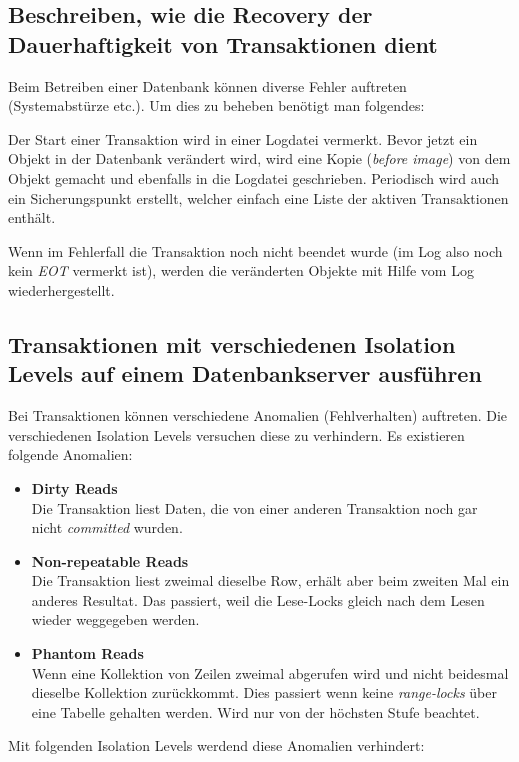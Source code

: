 \subsection{Beschreiben, wie die Recovery der Dauerhaftigkeit von Transaktionen dient}

Beim Betreiben einer Datenbank können diverse Fehler auftreten (Systemabstürze etc.). Um dies zu beheben benötigt man folgendes:

Der Start einer Transaktion wird in einer Logdatei vermerkt. Bevor jetzt ein Objekt in der Datenbank verändert wird, wird eine Kopie (\emph{before image}) von dem Objekt gemacht und ebenfalls in die Logdatei geschrieben. Periodisch wird auch ein Sicherungspunkt erstellt, welcher einfach eine Liste der aktiven Transaktionen enthält.

Wenn im Fehlerfall die Transaktion noch nicht beendet wurde (im Log also noch kein \emph{EOT} vermerkt ist), werden die veränderten Objekte mit Hilfe vom Log wiederhergestellt.

\subsection{Transaktionen mit verschiedenen Isolation Levels auf einem Datenbankserver ausführen}

Bei Transaktionen können verschiedene Anomalien (Fehlverhalten) auftreten. Die verschiedenen Isolation Levels versuchen diese zu verhindern. Es existieren folgende Anomalien:

\begin{itemize}
	\item \textbf{Dirty Reads} \\
	Die Transaktion liest Daten, die von einer anderen Transaktion noch gar nicht \emph{committed} wurden.
	\item \textbf{Non-repeatable Reads} \\
	Die Transaktion liest zweimal dieselbe Row, erhält aber beim zweiten Mal ein anderes Resultat. Das passiert, weil die Lese-Locks gleich nach dem Lesen wieder weggegeben werden.
	\item \textbf{Phantom Reads} \\
	Wenn eine Kollektion von Zeilen zweimal abgerufen wird und nicht beidesmal dieselbe Kollektion zurückkommt. Dies passiert wenn keine \emph{range-locks} über eine Tabelle gehalten werden. Wird nur von der höchsten Stufe beachtet.
\end{itemize}

\noindent
Mit folgenden Isolation Levels werdend diese Anomalien verhindert:


